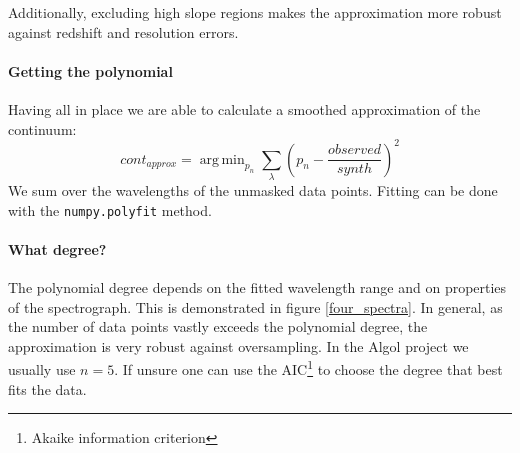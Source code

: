 \documentclass[10pt,a4paper,notitlepage,twocolumn]{article}
\DeclareMathOperator*{\argmin}{arg\,min}
\begin{document}
Additionally, excluding high slope regions makes the approximation more robust against redshift and resolution errors. 


\paragraph{Getting the polynomial}
Having all in place we are able to calculate a smoothed approximation of the continuum:
\begin{equation}
	\label{eq:cont_approx}
	cont_{approx} = \argmin_{p_n} \sum_{\lambda} \left( p_n - \frac{observed}{synth} \right)^2
\end{equation}
We sum over the wavelengths of the unmasked data points.
Fitting can be done with the \verb|numpy.polyfit| method.

\paragraph{What degree?}
The polynomial degree depends on the fitted wavelength range and on properties of the spectrograph.
This is demonstrated in figure \ref{four_spectra}.
In general, as the number of data points vastly exceeds the polynomial degree, the approximation is very robust against oversampling.
In the Algol project we usually use $n=5$.
If unsure one can use the AIC\footnote{Akaike information criterion} \cite{Akaike1974} to choose the degree that best fits the data.
\end{document}
